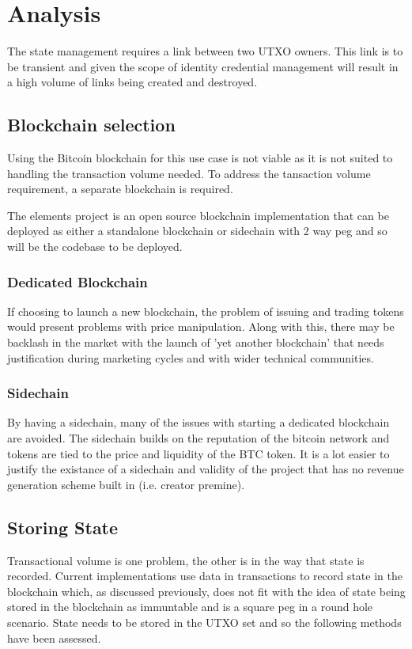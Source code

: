 \documentclass[10pt,a4paper]{runcrypto}
\begin{document}
\section{Analysis}
The state management requires a link between two UTXO owners. This link is to be transient and given the scope of identity credential management will result in a high volume of links being created and destroyed.

\subsection{Blockchain selection}

Using the Bitcoin blockchain for this use case is not viable as it is not suited to handling the transaction volume needed. To address the tansaction volume requirement, a separate blockchain is required.

The elements project is an open source blockchain implementation that can be deployed as either a standalone blockchain or sidechain with 2 way peg and so will be the codebase to be deployed.

\subsubsection{Dedicated Blockchain}

If choosing to launch a new blockchain, the problem of issuing and trading tokens would present problems with price manipulation. Along with this, there may be backlash in the market with the launch of 'yet another blockchain' that needs justification during marketing cycles and with wider technical communities.

\subsubsection{Sidechain}

By having a sidechain, many of the issues with starting a dedicated blockchain are avoided. The sidechain builds on the reputation of the bitcoin network and tokens are tied to the price and liquidity of the BTC token. It is a lot easier to justify the existance of a sidechain and validity of the project that has no revenue generation scheme built in (i.e. creator premine).

\subsection{Storing State}
Transactional volume is one problem, the other is in the way that state is recorded. Current implementations use data in transactions to record state in the blockchain which, as discussed previously, does not fit with the idea of state being stored in the blockchain as immuntable and is a square peg in a round hole scenario. State needs to be stored in the UTXO set and so the following methods have been assessed.
\end{document}
